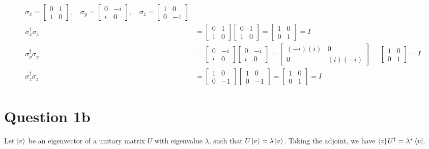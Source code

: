 \documentclass{article}
\begin{document}
\begin{align*}
\sigma_x = \begin{bmatrix} 0 & 1 \\ 1 & 0 \end{bmatrix}, \quad \sigma_y = \begin{bmatrix} 0 & -i \\ i & 0 \end{bmatrix}, \quad \sigma_z = \begin{bmatrix} 1 & 0 \\ 0 & -1 \end{bmatrix} \\
\sigma_x^\dagger \sigma_x &= \begin{bmatrix} 0 & 1 \\ 1 & 0 \end{bmatrix} \begin{bmatrix} 0 & 1 \\ 1 & 0 \end{bmatrix} = \begin{bmatrix} 1 & 0 \\ 0 & 1 \end{bmatrix} = I \\
\sigma_y^\dagger \sigma_y &= \begin{bmatrix} 0 & -i \\ i & 0 \end{bmatrix} \begin{bmatrix} 0 & -i \\ i & 0 \end{bmatrix} = \begin{bmatrix} (-i)(i) & 0 \\ 0 & (i)(-i) \end{bmatrix} = \begin{bmatrix} 1 & 0 \\ 0 & 1 \end{bmatrix} = I \\
\sigma_z^\dagger \sigma_z &= \begin{bmatrix} 1 & 0 \\ 0 & -1 \end{bmatrix} \begin{bmatrix} 1 & 0 \\ 0 & -1 \end{bmatrix} = \begin{bmatrix} 1 & 0 \\ 0 & 1 \end{bmatrix} = I
\end{align*}

\section*{Question 1b}
Let $\ket{v}$ be an eigenvector of a unitary matrix $U$ with eigenvalue $\lambda$, such that $U\ket{v} = \lambda \ket{v}$. Taking the adjoint, we have $\bra{v} U^\dagger = \lambda^* \bra{v}$.
\end{document}
